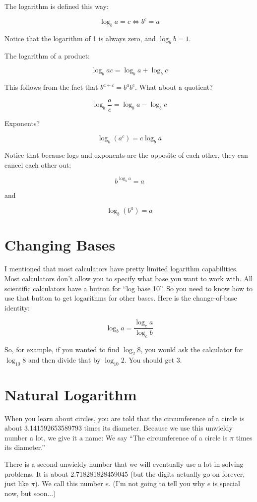 The logarithm is defined this way:

$$\log_b a = c \iff b^c = a$$

Notice that the logarithm of 1 is always zero, and $\log_b b = 1$.

The logarithm of a product:

$$\log_b a c = \log_b a + \log_b c$$

This follows from the fact that $b^{a + c} = b^a b^c$. What about a quotient?

$$\log_b \frac{a}{c} = \log_b a - \log_b c$$

Exponents?

$$\log_b \left(a^c\right) = c \log_b a$$

Notice that because logs and exponents are the opposite of each other, they can cancel each other out:

$$b^{\log_b a} = a$$

and

$$\log_b \left(b^a\right) = a$$

\section{Changing Bases}

I mentioned that most calculators have pretty limited logarithm
capabilities. Most calculators don't allow you to specify what base
you want to work with. All scientific calculators have a button for
``log base 10''.  So you need to know how to use that button to get
logarithms for other bases. Here is the change-of-base identity:

$$\log_b a = \frac {\log_c a}{\log_c b}$$

So, for example, if you wanted to find $\log_2 8$, you would ask the
calculator for $\log_{10} 8$ and then divide that by $\log_{10} 2$.
You should get 3.

\section{Natural Logarithm}

When you learn about circles, you are told that the circumference of a
circle is about 3.141592653589793 times its diameter.  Because we use
this unwieldy number a lot, we give it a name: We say ``The
circumference of a circle is $\pi$ times its diameter.''

There is a second unwieldy number that we will eventually use a lot in
solving problems. It is about 2.718281828459045 (but the digits
actually go on forever, just like $\pi$). We call this number $e$. (I'm
not going to tell you why $e$ is special now, but soon...)

